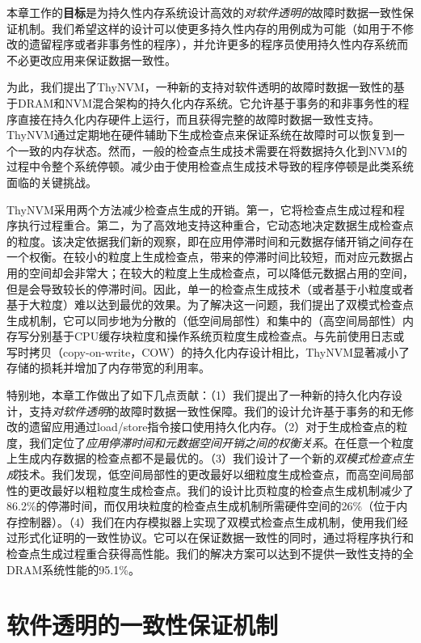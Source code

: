 本章工作的\textbf{目标}是为持久性内存系统设计高效的\emph{对软件透明的}故障时数据一致性保证机制。我们希望这样的设计可以使更多持久性内存的用例成为可能（如用于不修改的遗留程序或者非事务性的程序），并允许更多的程序员使用持久性内存系统而不必更改应用来保证数据一致性。

为此，我们提出了ThyNVM，一种新的支持对软件透明的故障时数据一致性的基于DRAM和NVM混合架构的持久化内存系统。它允许基于事务的和非事务性的程序直接在持久化内存硬件上运行，而且获得完整的故障时数据一致性支持。ThyNVM通过定期地在硬件辅助下生成检查点来保证系统在故障时可以恢复到一个一致的内存状态。然而，一般的检查点生成技术需要在将数据持久化到NVM的过程中令整个系统停顿。减少由于使用检查点生成技术导致的程序停顿是此类系统面临的关键挑战。

ThyNVM采用两个方法减少检查点生成的开销。第一，它将检查点生成过程和程序执行过程重合。第二，为了高效地支持这种重合，它动态地决定数据生成检查点的粒度。该决定依据我们新的观察，即在应用停滞时间和元数据存储开销之间存在一个权衡。在较小的粒度上生成检查点，带来的停滞时间比较短，而对应元数据占用的空间却会非常大；在较大的粒度上生成检查点，可以降低元数据占用的空间，但是会导致较长的停滞时间。因此，单一的检查点生成技术（或者基于小粒度或者基于大粒度）难以达到最优的效果。为了解决这一问题，我们提出了双模式检查点生成机制，它可以同步地为分散的（低空间局部性）和集中的（高空间局部性）内存写分别基于CPU缓存块粒度和操作系统页粒度生成检查点。与先前使用日志\cite{Volos:2011:MLP:1950365.1950379, Coburn:2011:NMP:1950365.1950380}或写时拷贝（copy-on-write，COW）\cite{Condit:2009:BIT:1629575.1629589, Venkataraman:2011:CDD:1960475.1960480}的持久化内存设计相比，ThyNVM显著减小了存储的损耗并增加了内存带宽的利用率。

特别地，本章工作做出了如下几点贡献：（1）我们提出了一种新的持久化内存设计，支持\emph{对软件透明}的故障时数据一致性保障。我们的设计允许基于事务的和无修改的遗留应用通过load/store指令接口使用持久化内存。（2）对于生成检查点的粒度，我们定位了\emph{应用停滞时间和元数据空间开销之间的权衡关系}。在任意一个粒度上生成内存数据的检查点都不是最优的。（3）我们设计了一个新的\emph{双模式检查点生成}技术。我们发现，低空间局部性的更改最好以细粒度生成检查点，而高空间局部性的更改最好以粗粒度生成检查点。我们的设计比页粒度的检查点生成机制减少了86.2\%的停滞时间，而仅用块粒度的检查点生成机制所需硬件空间的26\%（位于内存控制器）。（4）我们在内存模拟器上实现了双模式检查点生成机制，使用我们经过形式化证明的一致性协议。它可以在保证数据一致性的同时，通过将程序执行和检查点生成过程重合获得高性能。我们的解决方案可以达到不提供一致性支持的全DRAM系统性能的95.1\%。

\section{软件透明的一致性保证机制}

